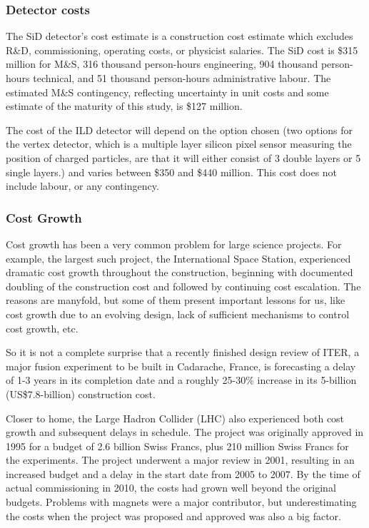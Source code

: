\subsubsection{Detector costs}

The SiD detector's cost estimate is a construction cost estimate which excludes R\&D, commissioning, operating costs, or physicist salaries. The SiD cost is \$315 million for M\&S, 316 thousand person-hours engineering, 904 thousand person-hours technical, and 51 thousand person-hours administrative labour. The estimated M\&S contingency, reflecting uncertainty in unit costs and some estimate of the maturity of this study, is \$127 million.

The cost of the ILD detector will depend on the option chosen (two options for the vertex detector, which is a multiple layer silicon pixel sensor measuring the position of charged particles, are that it will either consist of 3 double layers or 5 single layers.) and varies between \$350 and \$440 million. This cost does not include labour, or any contingency.
 
\subsubsection{Cost Growth}

Cost growth has been a very common problem for large science projects. For example, the largest such project, the International Space Station, experienced dramatic cost growth throughout the construction, beginning with documented doubling of the construction cost and followed by continuing cost escalation. The reasons are manyfold, but some of them present important lessons for us, like cost growth due to an evolving design, lack of sufficient mechanisms to control cost growth, etc. 

So it is not a complete surprise that a recently finished design review of ITER, a major fusion experiment to be built in Cadarache, France, is forecasting a delay of 1-3 years in its completion date and a roughly 25-30\% increase in its 5-billion (US\$7.8-billion) construction cost. 

Closer to home, the Large Hadron Collider (LHC) also experienced both cost growth and subsequent delays in schedule. The project was originally approved in 1995 for a budget of 2.6 billion Swiss Francs, plus 210 million Swiss Francs for the experiments. The project underwent a major review in 2001, resulting in an increased budget and a delay in the start date from 2005 to 2007. By the time of actual commissioning in 2010, the costs had grown well beyond the original budgets. Problems with magnets were a major contributor, but underestimating the costs when the project was proposed and approved was also a big factor. \cite{ILC:CostMegaprojects}
  
